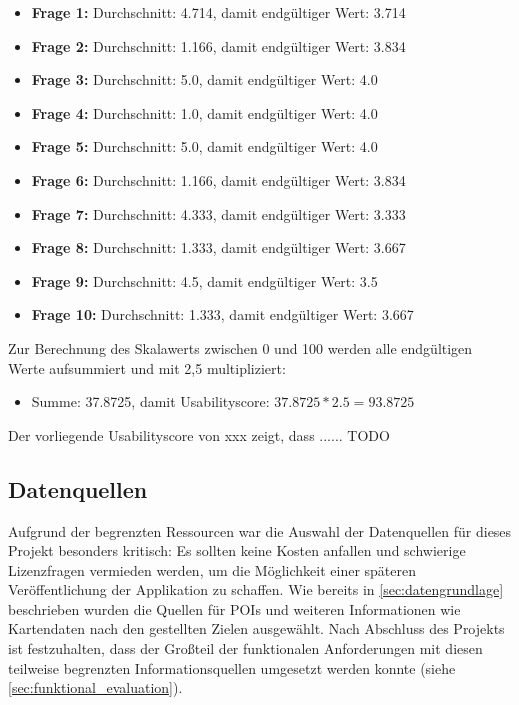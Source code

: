 		\begin{itemize}
			\item \textbf{Frage 1:} Durchschnitt: 4.714, damit endgültiger Wert: 3.714
			\item \textbf{Frage 2:} Durchschnitt: 1.166, damit endgültiger Wert: 3.834
			\item \textbf{Frage 3:} Durchschnitt: 5.0, damit endgültiger Wert: 4.0
			\item \textbf{Frage 4:} Durchschnitt: 1.0, damit endgültiger Wert: 4.0
			\item \textbf{Frage 5:} Durchschnitt: 5.0, damit endgültiger Wert: 4.0
			\item \textbf{Frage 6:} Durchschnitt: 1.166, damit endgültiger Wert: 3.834
			\item \textbf{Frage 7:} Durchschnitt: 4.333, damit endgültiger Wert: 3.333
			\item \textbf{Frage 8:} Durchschnitt: 1.333, damit endgültiger Wert: 3.667
			\item \textbf{Frage 9:} Durchschnitt: 4.5, damit endgültiger Wert: 3.5
			\item \textbf{Frage 10:} Durchschnitt: 1.333, damit endgültiger Wert: 3.667
		\end{itemize}
	
	Zur Berechnung des Skalawerts zwischen 0 und 100 werden alle endgültigen Werte aufsummiert und mit 2,5 multipliziert:
	
	\begin{itemize}
		\item Summe: 37.8725, damit Usabilityscore: $37.8725*2.5=93.8725$
	\end{itemize}

	Der vorliegende Usabilityscore von xxx zeigt, dass ...... TODO
	
	\subsection{Datenquellen}
	Aufgrund der begrenzten Ressourcen war die Auswahl der Datenquellen für dieses Projekt besonders kritisch: Es sollten keine Kosten anfallen und schwierige Lizenzfragen vermieden werden, um die Möglichkeit einer späteren Veröffentlichung der Applikation zu schaffen. Wie bereits in \autoref{sec:datengrundlage} beschrieben wurden die Quellen für \acs{POI}s und weiteren Informationen wie Kartendaten nach den gestellten Zielen ausgewählt. Nach Abschluss des Projekts ist festzuhalten, dass der Großteil der funktionalen Anforderungen mit diesen teilweise begrenzten Informationsquellen umgesetzt werden konnte (siehe \autoref{sec:funktional_evaluation}).
	
